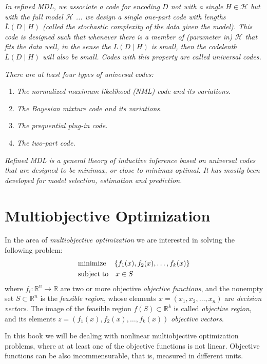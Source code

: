 {\emph{In refined MDL, we associate a code for encoding $D$ not with
a single $H\in\mathcal{H}$ but with the full model $\mathcal{H}$
... we design a single one-part code with lengths $\bar{L}\left(D\mid H\right)$
(called the stochastic complexity of the data given the model). This
code is designed such that whenever there is a member of (parameter
in) $\mathcal{H}$ that fits the data well, in the sense the $L\left(D\mid H\right)$
is small, then the codelenth $\bar{L}\left(D\mid H\right)$ will also
be small. Codes with this property are called universal codes.}

\emph{There are at least four types of universal codes:}
\begin{enumerate}
\item \emph{The normalized maximum likelihood (NML) code and its variations.}
\item \emph{The Bayesian mixture code and its variations.}
\item \emph{The prequential plug-in code.}
\item \emph{The two-part code.}
\end{enumerate}
\emph{Refined MDL is a general theory of inductive inference based
on universal codes that are designed to be minimax, or close to minimax
optimal. It has mostly been developed for model selection, estimation
and prediction.}

\section{Multiobjective Optimization}

In the area of \emph{multiobjective optimization} we are interested in solving the following problem:
\begin{align*}
 & \text{minimize}	   \quad \left\{f_1(x), f_2(x), \ldots, f_k(x) \right\} \\
 & \text{subject\;to} \quad x \in S
\end{align*}
where $f_i:\mathbb{R}^n \rightarrow \mathbb{R}$ are two or more objective \emph{objective functions}, and the nonempty set $S \subset \mathbb{R}^n$ is the \emph{feasible region}, whose elements $x=\left( x_1, x_2, \ldots, x_n \right)$ are \emph{decision vectors}. The image of the feasible region $f(S) \subset \mathbb{R}^k$ is called \emph{objective region}, and its elements $z = \left(f_1(x), f_2(x), \ldots, f_k(x) \right)$ \emph{objective vectors}.

In this book we will be dealing with nonlinear multiobjective optimization problems, where at at least one of the objective functions is not linear. Objective functions can be also incommensurable, that is, measured in different units.

}
